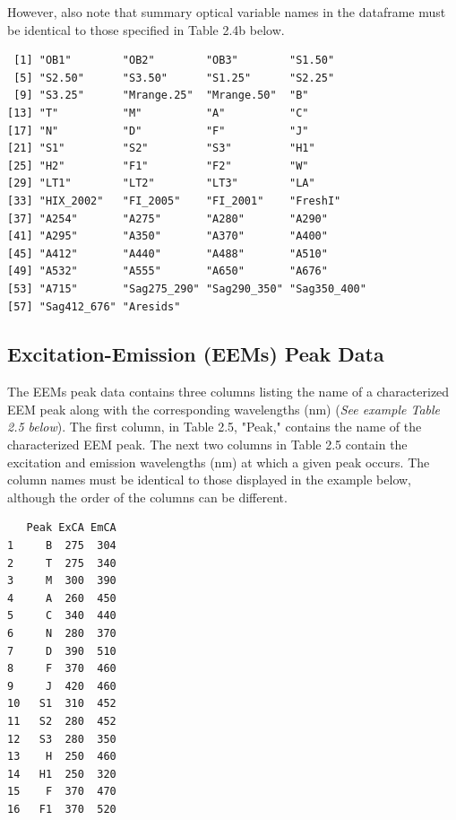 \documentclass[a4paper,11pt]{article}\usepackage[]{graphicx}\usepackage[]{color}
\makeatletter
\newenvironment{kframe}{%
 \def\at@end@of@kframe{}%
 \ifinner\ifhmode%
  \def\at@end@of@kframe{\end{minipage}}%
  \begin{minipage}{\columnwidth}%
 \fi\fi%
 \def\FrameCommand##1{\hskip\@totalleftmargin \hskip-\fboxsep
 \colorbox{shadecolor}{##1}\hskip-\fboxsep
     \hskip-\linewidth \hskip-\@totalleftmargin \hskip\columnwidth}%
 \MakeFramed {\advance\hsize-\width
   \@totalleftmargin\z@ \linewidth\hsize
   \@setminipage}}%
 {\par\unskip\endMakeFramed%
 \at@end@of@kframe}
\newenvironment{knitrout}{}{} %
\makeatother
\begin{document}
However, also note that summary optical variable names in the dataframe must be identical to those specified in Table 2.4b below. 

\begin{knitrout}
\color{fgcolor}\begin{kframe}
\begin{verbatim}
 [1] "OB1"        "OB2"        "OB3"        "S1.50"     
 [5] "S2.50"      "S3.50"      "S1.25"      "S2.25"     
 [9] "S3.25"      "Mrange.25"  "Mrange.50"  "B"         
[13] "T"          "M"          "A"          "C"         
[17] "N"          "D"          "F"          "J"         
[21] "S1"         "S2"         "S3"         "H1"        
[25] "H2"         "F1"         "F2"         "W"         
[29] "LT1"        "LT2"        "LT3"        "LA"        
[33] "HIX_2002"   "FI_2005"    "FI_2001"    "FreshI"    
[37] "A254"       "A275"       "A280"       "A290"      
[41] "A295"       "A350"       "A370"       "A400"      
[45] "A412"       "A440"       "A488"       "A510"      
[49] "A532"       "A555"       "A650"       "A676"      
[53] "A715"       "Sag275_290" "Sag290_350" "Sag350_400"
[57] "Sag412_676" "Aresids"   
\end{verbatim}
\end{kframe}
\end{knitrout}

\subsection{Excitation-Emission (EEMs) Peak Data}
The EEMs peak data contains three columns listing the name of a characterized EEM peak along with the corresponding wavelengths (nm) (\emph{See example Table 2.5 below}). The first column, in Table 2.5, "Peak," contains the name of the characterized EEM peak. The next two columns in Table 2.5 contain the excitation and emission wavelengths (nm) at which a given peak occurs. The column names must be identical to those displayed in the example below, although the order of the columns can be different. 

\begin{knitrout}
\color{fgcolor}\begin{kframe}
\begin{verbatim}
   Peak ExCA EmCA
1     B  275  304
2     T  275  340
3     M  300  390
4     A  260  450
5     C  340  440
6     N  280  370
7     D  390  510
8     F  370  460
9     J  420  460
10   S1  310  452
11   S2  280  452
12   S3  280  350
13    H  250  460
14   H1  250  320
15    F  370  470
16   F1  370  520
\end{verbatim}
\end{kframe}
\end{knitrout}
\end{document}
